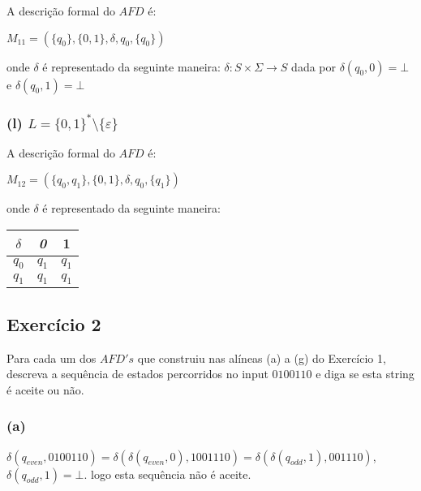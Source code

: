 \documentclass{article}
\begin{document}
A descrição formal do $AFD$ é:
\begin{center}
  $M_{11} = (\{q_{0}\}, \{0,1\},\delta, q_{0}, \{q_0\})$
\end{center}
onde $\delta$ é representado da seguinte maneira: $\delta:S\times \Sigma\to S$ dada por $\delta(q_0,0)=\bot$ e $\delta(q_0,1)=\bot$

\subsubsection*{(l) $L = \{0, 1\}^{*} \setminus \{\varepsilon\}$}

\begin{center}
\end{center}

A descrição formal do $AFD$ é:
\begin{center}
  $M_{12} = (\{q_{0},q_1\}, \{0,1\},\delta, q_{0}, \{q_1\})$
\end{center}

\pagebreak

onde $\delta$ é representado da seguinte maneira:
\begin{table}[htbp]
  \centering
  \begin{tabular}{c|cc}
    \textit{$\delta$} & \textit{0} & 1       \\ \hline
    $q_{0}$           & $q_{1}$    & $q_{1}$ \\
    $q_{1}$           & $q_{1}$    & $q_{1}$
  \end{tabular}
\end{table}

\subsection*{Exercício 2}
Para cada um dos $AFD's$ que construiu nas alíneas (a) a (g) do Exercício 1, descreva a sequência de estados percorridos no input $0100110$ e diga se esta string é aceite ou não.

\subsubsection*{(a)}
$\delta(q_{even}, 0100110) = \delta(\delta(q_{even}, 0), 1001110) = \delta(\delta(q_{odd}, 1), 001110)$, $\delta(q_{odd}, 1) = \bot$. logo esta sequência não é aceite.
\end{document}
